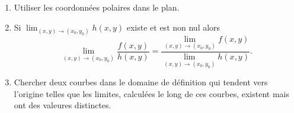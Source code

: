 {\begin{enumerate}
{\begin{enumerate}
\item Utiliser les coordonn\'ees polaires dans le plan.

\item Si $\lim_{(x,y) \to (x_0,y_0)}h(x,y)$ existe et est non nul
alors 
\[
\lim_{(x,y) \to (x_0,y_0)}\frac{f(x,y)}{h(x,y)}=
\frac{\lim_{(x,y) \to (x_0,y_0)}f(x,y)}{\lim_{(x,y) \to (x_0,y_0)}h(x,y)} .
\]
\item
Chercher deux courbes dans
le domaine de d\'efinition
qui tendent vers l'origine
telles que les limites, calcul\'ees le long de ces courbes,
existent mais ont des valeures distinctes.
\end{enumerate}}
\end{enumerate}
}
